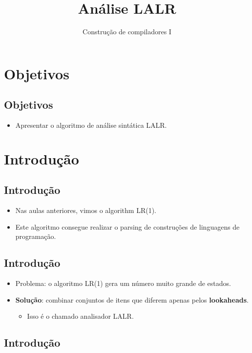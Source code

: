 \documentclass[11pt]{article}
\author{Construção de compiladores I}
\date{}
\title{Análise LALR}
\begin{document}
\maketitle
\section*{Objetivos}
\label{sec:orgde88dae}

\subsection*{Objetivos}
\label{sec:orgba51b5e}

\begin{itemize}
\item Apresentar o algoritmo de análise sintática LALR.
\end{itemize}
\section*{Introdução}
\label{sec:org5aa299a}

\subsection*{Introdução}
\label{sec:org9b23995}

\begin{itemize}
\item Nas aulas anteriores, vimos o algorithm LR(1).

\item Este algoritmo consegue realizar o parsing de construções
de linguagens de programação.
\end{itemize}
\subsection*{Introdução}
\label{sec:orgdacb32a}

\begin{itemize}
\item Problema: o algoritmo LR(1) gera um número muito grande de estados.

\item \textbf{Solução}: combinar conjuntos de itens que diferem apenas pelos \textbf{lookaheads}.
\begin{itemize}
\item Isso é o chamado analisador LALR.
\end{itemize}
\end{itemize}
\subsection*{Introdução}
\label{sec:org339196d}
\end{document}
